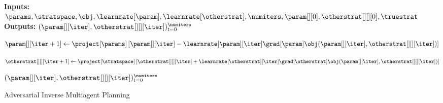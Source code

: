 % 
\begin{wrapfigure}{L}{0.533\textwidth}
\vspace{-1cm}
\begin{minipage}{0.533\textwidth}
\begin{algorithm}[H]
\caption{Adversarial Inverse Multiagent Planning}
\textbf{Inputs:} $\params, \stratspace, \obj, \learnrate[\param],  \learnrate[\otherstrat], \numiters, \param[][0], \otherstrat[][][0], \truestrat$  \\
\textbf{Outputs:} $(\param[][\iter], \otherstrat[][][\iter])_{t = 0}^\numiters$
\label{alg:gda}
\begin{algorithmic}[1]
    
    \State  $\param[][\iter + 1] \gets \project[\params] \left[\param[][\iter] - \learnrate[\param][\iter] \grad[{\param}] \obj(\param[][\iter], \otherstrat[][][\iter]) \right]$
    
    \State  $\otherstrat[][][\iter + 1]  \gets \project[\stratspace] \left[ \otherstrat[][][\iter] + \learnrate[\otherstrat][\iter] \grad[{\otherstrat}] \obj(\param[][\iter], \otherstrat[][][\iter]) \right]$

\EndFor
\State \Return $(\param[][\iter], \otherstrat[][][\iter])_{t = 0}^\numiters$
\end{algorithmic}
\end{algorithm}
\end{minipage}
\vspace{-0.33cm}
\end{wrapfigure}
